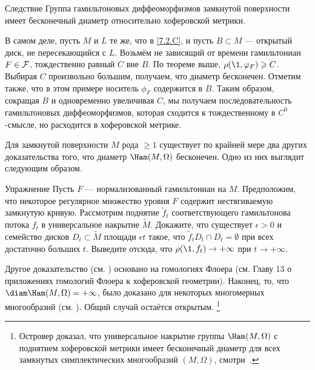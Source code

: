 \begin{thm}{Следствие}\label{7.2.D} Группа гамильтоновых диффеоморфизмов замкнутой поверхности имеет бесконечный диаметр относительно хоферовской метрики.
\end{thm}

В самом деле, пусть $M$ и $L$ те же, что в \ref{7.2.C}, и пусть $B \subset M$ — открытый диск, не пересекающийся с $L$.
Возьмём не зависящий от времени гамильтониан $F \in \mathcal{F}$, тождественно равный $C$ вне $B$.
По теореме выше, $\rho (\1, \phi_F) \ge C$.
Выбирая $C$ произвольно большим, получаем, что диаметр бесконечен.
Отметим также, что в этом примере носитель $\phi_F$ содержится в $B$.
Таким образом, сокращая $B$ и одновременно увеличивая $C$, мы получаем
последовательность гамильтоновых диффеоморфизмов, которая сходится к
тождественному в $C^0$-смысле, но расходится в хоферовской метрике. 

Для замкнутой поверхности $M$ рода $\ge 1$ существует по крайней мере
два других доказательства того, что диаметр $\Ham (M, \Omega)$
бесконечен. 
Одно из них выглядит следующим образом. 

\begin{ex}[(см. \cite{LM2}).]{Упражнение} \label{7.2.E}
Пусть $F$ — нормализованный гамильтониан на $M$.
Предположим, что некоторое регулярное множество уровня $F$ содержит
нестягиваемую замкнутую кривую.  
Рассмотрим поднятие $\tilde f_t$ соответствующего гамильтонова потока
$f_t$ в универсальное накрытие $\tilde M$.  
Докажите, что существует $\epsilon> 0$ и семейство дисков $D_t \subset
\tilde M$ площади $\epsilon t$ такое, что $\tilde f_t D_t \cap D_t =
\emptyset$ при всех достаточно больших $t$.  
Выведите отсюда, что $\rho (\1, f_t) \to + \infty$ при $t \to + \infty$.  
\end{ex}

Другое доказательство (см. \cite{Sch3}) основано на
гомологиях Флоера (см. Главу 13 о приложениях гомологий Флоера к
хоферовской геометрии).
Наконец, то, что $\diam \Ham (M, \Omega) = + \infty$, было доказано
для некоторых многомерных многообразий
(см. \cite{LM2,Sch3,P5}).
Общий случай остаётся открытым.%
\footnote{
Островер доказал, что универсальное накрытие группы $\Ham(M,\Omega)$ с
поднятием хоферовской метрики имеет бесконечный диаметр для всех
замкнутых симплектических многообразий $(M,\Omega)$, смотри~\cite{O03,McD09}.\dpp}

